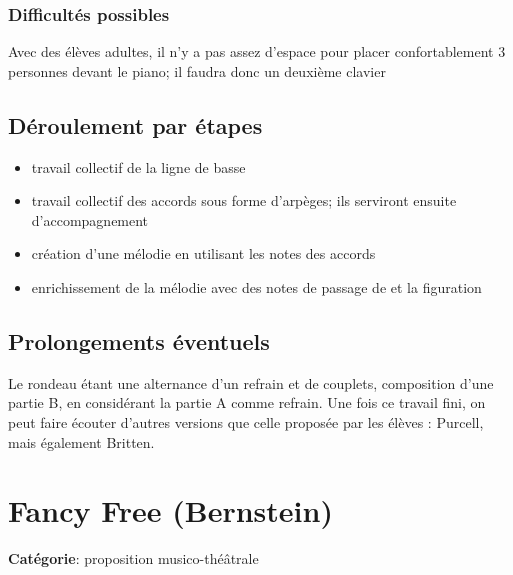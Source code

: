 \documentclass[a4paper,11pt,bibliography=totoc,numbers=noenddot,listof=flat,DIV=11,BCOR=0mm]{scrreprt}%
\begin{document}
\subsection*{Difficultés possibles}
Avec des élèves adultes, il n'y a pas assez d'espace pour placer confortablement 3 personnes devant le piano; il faudra donc un deuxième clavier

\section*{Déroulement par étapes}
\begin{itemize}
\item travail collectif de la ligne de basse
\item travail collectif des accords sous forme d'arpèges; ils serviront ensuite d'accompagnement
\item création d'une mélodie en utilisant les notes des accords
\item enrichissement de la mélodie avec des notes de passage de et la figuration
\end{itemize}



%

\section*{Prolongements éventuels}
Le rondeau étant une alternance d'un refrain et de couplets, composition d'une partie B, en considérant la partie A comme refrain. Une fois ce travail fini, on peut faire écouter d'autres versions que celle proposée par les élèves : Purcell, mais également Britten.


\chapter[Proposition musico-théâtrale: Fancy Free]{Fancy Free (Bernstein)}

{\large \textbf{Catégorie}}: proposition musico-théâtrale 

\end{document}
